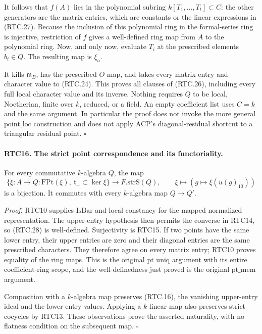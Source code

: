 It follows that \(f(A)\) lies in the polynomial subring
\(k[T_1,\ldots,T_t]\subset C\): the other generators are the
matrix entries, which are constants or the linear expressions
in (RTC.27).  Because the inclusion of this polynomial ring in
the formal-series ring is injective, restriction of \(f\) gives
a well-defined ring map from \(A\) to the polynomial ring.
Now, and only now, evaluate \(T_i\) at the prescribed elements
\(b_i\in Q\).  The resulting map is \(\xi_a\).

It kills \(\mathfrak m_B\), has the prescribed \(O\)-map,
and takes every matrix entry and character value to (RTC.24).
This proves all clauses of (RTC.26), including every full local
character value and its inverse.  Nothing requires \(Q\) to be
local, Noetherian, finite over \(k\), reduced, or a field.
An empty coefficient list uses \(C=k\) and the same argument.
In particular the proof does not invoke the more general
\(\mathrm{point\_loc}\) construction and does not apply ACP's
diagonal-residual shortcut to a triangular residual point.
\hfill\(\square\)

\paragraph{RTC16. The strict point correspondence and its functoriality.}
\label{claim:RTC16}
For every commutative \(k\)-algebra \(Q\), the map
\[
 \{\xi:A\to Q:\mathrm{FPt}(\xi),\
                   \mathfrak t_-\subset\ker\xi\}
   \longrightarrow F.\mathrm{strS}(Q),\qquad
       \xi\longmapsto(g\mapsto\xi(u(g)_{10}))
                                                        \tag{RTC.28}
\]
is a bijection.  It commutes with every \(k\)-algebra map
\(Q\to Q'\).

\emph{Proof.}
RTC10 supplies \(\mathrm{IsBar}\) and local constancy for the
mapped normalized representation.  The upper-entry hypothesis
then permits the converse in RTC14, so (RTC.28) is well-defined.
Surjectivity is RTC15.  If two points have the same lower entry,
their upper entries are zero and their diagonal entries are the
same prescribed characters.  They therefore agree on every matrix
entry; RTC10 proves equality of the ring maps.  This is the
original \(\mathrm{pt\_uniq}\) argument with its entire
coefficient-ring scope, and the well-definedness just proved is
the original \(\mathrm{pt\_mem}\) argument.

Composition with a \(k\)-algebra map preserves (RTC.16), the
vanishing upper-entry ideal and the lower-entry values.  Applying
a \(k\)-linear map also preserves strict cocycles by RTC13.
These observations prove the asserted naturality, with no flatness
condition on the subsequent map. \hfill\(\square\)

